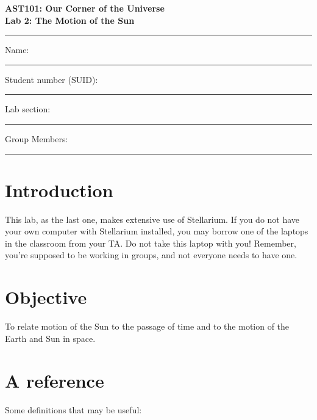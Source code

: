 \documentclass[11pt]{article}
\begin{document}
\begin{center}
\textbf{\Large
AST101: Our Corner of the Universe \\
\vspace*{0.1cm}
Lab 2: The Motion of the Sun
}
\end{center}

\vspace*{0.5cm}

\hrule
{\Large Name:}\vspace*{0.5cm}\\\hrule
{\Large Student number (SUID):}\vspace*{0.5cm}\\\hrule
{\Large Lab section:}\vspace*{0.5cm}\\\hrule
{\Large Group Members:}\vspace*{0.5cm}\\\hrule
\vspace*{0.5cm}

\section{Introduction}

This lab, as the last one, makes extensive use of Stellarium. 
If you do not have your own computer with Stellarium installed, you may borrow one of the laptops in the classroom from your TA. Do not take this laptop with you! Remember, you're supposed to be working in groups, and not everyone needs to have one.

\section*{Objective}

To relate motion of the Sun to the passage of time and to the motion of the Earth and Sun in space.

\section{A reference}


Some definitions that may be useful:
\end{document}
